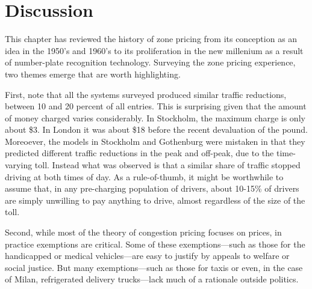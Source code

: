 \section{Discussion}\label{sec:discussion}

This chapter has reviewed the history of zone pricing from its conception as an idea in the 1950's and 1960's to its proliferation in the new millenium as a result of number-plate recognition technology. Surveying the zone pricing experience, two themes emerge that are worth highlighting.

First, note that all the systems surveyed produced similar traffic reductions, between 10 and 20 percent of all entries. This is surprising given that the amount of money charged varies considerably. In Stockholm, the maximum charge is only about \$3. In London it was about \$18 before the recent devaluation of the pound. Moreoever, the models in Stockholm and Gothenburg were mistaken in that they predicted different traffic reductions in the peak and off-peak, due to the time-varying toll. Instead what was observed is that a similar share of traffic stopped driving at both times of day. As a rule-of-thumb, it might be worthwhile to assume that, in any pre-charging population of drivers, about 10-15\% of drivers are simply unwilling to pay anything to drive, almost regardless of the size of the toll.

Second, while most of the theory of congestion pricing focuses on prices, in practice exemptions are critical. Some of these exemptions---such as those for the handicapped or medical vehicles---are easy to justify by appeals to welfare or social justice. But many exemptions---such as those for taxis or even, in the case of Milan, refrigerated delivery trucks---lack much of a rationale outside politics.
